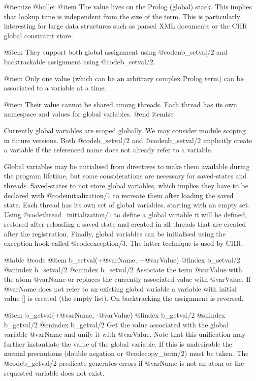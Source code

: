 {{{{{@itemize @bullet
@item The value lives on the Prolog (global) stack. This implies that
lookup time is independent from the size of the term. This is
particularly interesting for large data structures such as parsed XML
documents or the CHR global constraint store. 

@item They support both global assignment using @code{nb_setval/2} and
backtrackable assignment using @code{b_setval/2}.

@item Only one value (which can be an arbitrary complex Prolog term)
can be associated to a variable at a time. 

@item Their value cannot be shared among threads. Each thread has its own
namespace and values for global variables.
@end itemize

Currently global variables are scoped globally. We may consider module
scoping in future versions.   Both @code{b_setval/2} and
@code{nb_setval/2} implicitly create a variable if the referenced name
does not already refer to a variable.

Global variables may be initialised from directives to make them
available during the program lifetime, but some considerations are
necessary for saved-states and threads. Saved-states to not store
global variables, which implies they have to be declared with
@code{initialization/1} to recreate them after loading the saved
state. Each thread has its own set of global variables, starting with
an empty set. Using @code{thread_initialization/1} to define a global
variable it will be defined, restored after reloading a saved state
and created in all threads that are created after the
registration. Finally, global variables can be initialised using the
exception hook called @code{exception/3}. The latter technique is used
by CHR.

@table @code
@item b_setval(+@var{Name}, +@var{Value}) 
@findex b_setval/2
@snindex b_setval/2
@cnindex b_setval/2
Associate the term @var{Value} with the atom @var{Name} or replaces
the currently associated value with @var{Value}. If @var{Name} does
not refer to an existing global variable a variable with initial value
[] is created (the empty list). On backtracking the assignment is
reversed. 

@item b_getval(+@var{Name}, -@var{Value}) 
@findex b_getval/2
@snindex b_getval/2
@cnindex b_getval/2
Get the value associated with the global variable @var{Name} and unify
it with @var{Value}. Note that this unification may further
instantiate the value of the global variable. If this is undesirable
the normal precautions (double negation or @code{copy_term/2}) must be
taken. The @code{b_getval/2} predicate generates errors if @var{Name} is not
an atom or the requested variable does not exist. 

}}}}}
